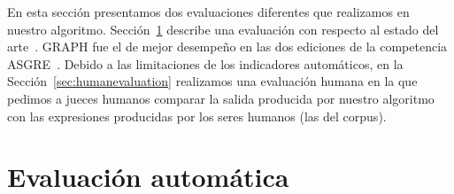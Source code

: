%  
En esta secci\'on presentamos dos evaluaciones diferentes que realizamos en nuestro algoritmo. Secci\'on~\ref{sec:automaticevaluation} describe una evaluaci\'on con respecto al estado del arte~\cite{KrahmerGRAPH}. GRAPH fue el de mejor desempe\~no en las dos ediciones de la competencia ASGRE~\cite{gatt-balz-kow:2008:ENLG}. Debido a las limitaciones de los indicadores autom\'aticos, en la Secci\'on~\ref{sec:humanevaluation} realizamos una evaluaci\'on humana en la que pedimos a jueces humanos comparar la salida producida por nuestro algoritmo con las expresiones producidas por los seres humanos (las del corpus).


\section{Evaluaci\'on autom\'atica } \label{sec:automaticevaluation}



